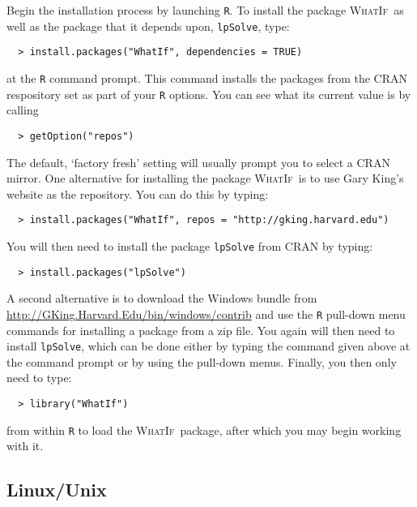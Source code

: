 \documentclass[oneside,letterpaper,titlepage]{article}
\newcommand{\WhatIf}{\textsc{WhatIf}}
\begin{document}
Begin the installation process by launching \texttt{R}.  To install
the package \WhatIf\ as well as the package that it depends upon,
\texttt{lpSolve}, type:
\begin{verbatim}
  > install.packages("WhatIf", dependencies = TRUE)
\end{verbatim}
at the \texttt{R} command prompt.  This command installs the packages
from the CRAN respository set as part of your \texttt{R} options.  You
can see what its current value is by calling
\begin{verbatim}
  > getOption("repos")
\end{verbatim}
The default, `factory fresh' setting will usually prompt you to select
a CRAN mirror.  One alternative for installing the package \WhatIf\ is
to use Gary King's website as the repository.  You can do this by
typing:
\begin{verbatim}
  > install.packages("WhatIf", repos = "http://gking.harvard.edu")
\end{verbatim}
You will then need to install the package \texttt{lpSolve} from CRAN by
typing:
\begin{verbatim}
  > install.packages("lpSolve")
\end{verbatim}
A second alternative is to download the Windows bundle from
\url{http://GKing.Harvard.Edu/bin/windows/contrib} and use the
\texttt{R} pull-down menu commands for installing a package from a zip
file.  You again will then need to install \texttt{lpSolve}, which can be
done either by typing the command given above at the command prompt or by
using the pull-down menus.  Finally, you then only need to type:
\begin{verbatim}
  > library("WhatIf") 
\end{verbatim}
from within \texttt{R} to load the \WhatIf\ package, after which you
may begin working with it.

\subsection{Linux/Unix}
\end{document}
